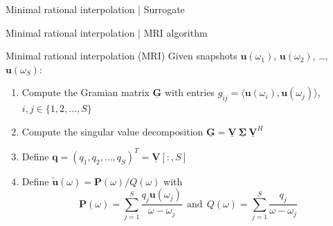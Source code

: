 \documentclass{beamer}
\begin{document}
\begin{frame}{Minimal rational interpolation | Surrogate}

    \vspace{20pt}

\end{frame}

\begin{frame}{Minimal rational interpolation | MRI algorithm}

    \begin{block}{Minimal rational interpolation (MRI)}
        Given snapshots $\mathbf{u}(\omega_1)$, $\mathbf{u}(\omega_2)$, \dots, $\mathbf{u}(\omega_S)$:
        \begin{enumerate}
            \item<2-> Compute the Gramian matrix $\mathbf{\underline{G}}$ with entries $g_{ij} = \langle \mathbf{u}(\omega_i), \mathbf{u}(\omega_j) \rangle$, $i,j \in \{1, 2, \dots, S\}$
            \item<3-> Compute the singular value decomposition $\mathbf{\underline{G}} = \mathbf{\underline{V}}~\boldsymbol{\underline{\Sigma}}~\mathbf{\underline{V}}^H$
            \item<4-> Define $\mathbf{q} = (q_1, q_2, \dots, q_S)^T = \mathbf{\underline{V}}[:, S]$
            \item<5-> Define $\mathbf{\tilde{u}}(\omega) = \mathbf{P}(\omega) / Q(\omega)$ with 
            \begin{equation*}
                \mathbf{P}(\omega) = \sum_{j=1}^S \frac{q_j \mathbf{u}(\omega_j)}{\omega - \omega_j}~~\text{and}~~Q(\omega) = \sum_{j=1}^S \frac{q_j}{\omega - \omega_j}
            \end{equation*}
        \end{enumerate}
    \end{block}

\end{frame}
\end{document}
